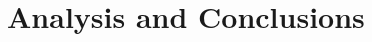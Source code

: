 \documentclass{cslthse-msc}
\begin{document}
%
%
%
\chapter{Analysis and Conclusions}
\label{sec:Anal_Con}
\end{document}
